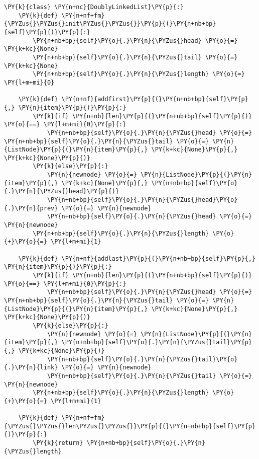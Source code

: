 \begin{Verbatim}[commandchars=\\\{\}]
\PY{k}{class} \PY{n+nc}{DoublyLinkedList}\PY{p}{:}
    \PY{k}{def} \PY{n+nf+fm}{\PYZus{}\PYZus{}init\PYZus{}\PYZus{}}\PY{p}{(}\PY{n+nb+bp}{self}\PY{p}{)}\PY{p}{:}
        \PY{n+nb+bp}{self}\PY{o}{.}\PY{n}{\PYZus{}head} \PY{o}{=} \PY{k+kc}{None}
        \PY{n+nb+bp}{self}\PY{o}{.}\PY{n}{\PYZus{}tail} \PY{o}{=} \PY{k+kc}{None}
        \PY{n+nb+bp}{self}\PY{o}{.}\PY{n}{\PYZus{}length} \PY{o}{=} \PY{l+m+mi}{0}

    \PY{k}{def} \PY{n+nf}{addfirst}\PY{p}{(}\PY{n+nb+bp}{self}\PY{p}{,} \PY{n}{item}\PY{p}{)}\PY{p}{:}
        \PY{k}{if} \PY{n+nb}{len}\PY{p}{(}\PY{n+nb+bp}{self}\PY{p}{)} \PY{o}{==} \PY{l+m+mi}{0}\PY{p}{:}
            \PY{n+nb+bp}{self}\PY{o}{.}\PY{n}{\PYZus{}head} \PY{o}{=} \PY{n+nb+bp}{self}\PY{o}{.}\PY{n}{\PYZus{}tail} \PY{o}{=} \PY{n}{ListNode}\PY{p}{(}\PY{n}{item}\PY{p}{,} \PY{k+kc}{None}\PY{p}{,} \PY{k+kc}{None}\PY{p}{)}
        \PY{k}{else}\PY{p}{:}
            \PY{n}{newnode} \PY{o}{=} \PY{n}{ListNode}\PY{p}{(}\PY{n}{item}\PY{p}{,} \PY{k+kc}{None}\PY{p}{,} \PY{n+nb+bp}{self}\PY{o}{.}\PY{n}{\PYZus{}head}\PY{p}{)}
            \PY{n+nb+bp}{self}\PY{o}{.}\PY{n}{\PYZus{}head}\PY{o}{.}\PY{n}{prev} \PY{o}{=} \PY{n}{newnode}
            \PY{n+nb+bp}{self}\PY{o}{.}\PY{n}{\PYZus{}head} \PY{o}{=} \PY{n}{newnode}
        \PY{n+nb+bp}{self}\PY{o}{.}\PY{n}{\PYZus{}length} \PY{o}{+}\PY{o}{=} \PY{l+m+mi}{1}

    \PY{k}{def} \PY{n+nf}{addlast}\PY{p}{(}\PY{n+nb+bp}{self}\PY{p}{,} \PY{n}{item}\PY{p}{)}\PY{p}{:}
        \PY{k}{if} \PY{n+nb}{len}\PY{p}{(}\PY{n+nb+bp}{self}\PY{p}{)} \PY{o}{==} \PY{l+m+mi}{0}\PY{p}{:}
            \PY{n+nb+bp}{self}\PY{o}{.}\PY{n}{\PYZus{}head} \PY{o}{=} \PY{n+nb+bp}{self}\PY{o}{.}\PY{n}{\PYZus{}tail} \PY{o}{=} \PY{n}{ListNode}\PY{p}{(}\PY{n}{item}\PY{p}{,} \PY{k+kc}{None}\PY{p}{,} \PY{k+kc}{None}\PY{p}{)}
        \PY{k}{else}\PY{p}{:}
            \PY{n}{newnode} \PY{o}{=} \PY{n}{ListNode}\PY{p}{(}\PY{n}{item}\PY{p}{,} \PY{n+nb+bp}{self}\PY{o}{.}\PY{n}{\PYZus{}tail}\PY{p}{,} \PY{k+kc}{None}\PY{p}{)}
            \PY{n+nb+bp}{self}\PY{o}{.}\PY{n}{\PYZus{}tail}\PY{o}{.}\PY{n}{link} \PY{o}{=} \PY{n}{newnode}
            \PY{n+nb+bp}{self}\PY{o}{.}\PY{n}{\PYZus{}tail} \PY{o}{=} \PY{n}{newnode}
        \PY{n+nb+bp}{self}\PY{o}{.}\PY{n}{\PYZus{}length} \PY{o}{+}\PY{o}{=} \PY{l+m+mi}{1}

    \PY{k}{def} \PY{n+nf+fm}{\PYZus{}\PYZus{}len\PYZus{}\PYZus{}}\PY{p}{(}\PY{n+nb+bp}{self}\PY{p}{)}\PY{p}{:}
        \PY{k}{return} \PY{n+nb+bp}{self}\PY{o}{.}\PY{n}{\PYZus{}length}
\end{Verbatim}



